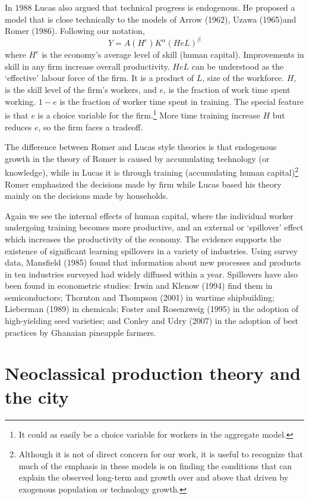 In 1988 Lucas also argued that technical progress is endogenous. He proposed a model that is  close technically to the models of Arrow (1962), Uzawa (1965)and Romer (1986). Following our notation, 
\[ Y = A(H^e) K^\alpha (HeL)^\beta \] 
where $H^e$ is the economy's average level of skill (human capital).  Improvements in skill in any firm  increase overall productivity.  $HeL$  can be understood as the `effective' labour force of the firm. It is a product of $L$, size of the workforce. $H$, is the skill level of the firm's workers, and $e$, is the fraction of work time spent working. $1-e$ is the fraction of worker time  spent in training. The  special feature is that $e$ is a choice variable for the firm.\footnote{It could as easily be a choice variable for workers in the aggregate model.} More time training increase $H$ but reduces $e$, so the firm faces a tradeoff.

The difference between Romer and Lucas style theories is that endogenous growth in the theory of Romer is caused by accumulating technology (or knowledge), while in Lucas it is through training (accumulating human capital)\footnote{Although it is not of direct concern for our work, it is useful to recognize that much of the emphasis in these models is on finding the conditions that can explain the observed long-term  and growth over and above that driven by exogenous population or technology growth. } Romer  emphasized the decisions made by firm while Lucas  based his theory mainly on the decisions made by households. 


Again we see the  internal effects of human capital, where the individual worker undergoing training becomes more productive, and an external or `spillover' effect which increases the productivity of the economy. 
The evidence supports the existence of significant learning spillovers in a variety of industries. Using survey data, Mansfield (1985) found that information about new processes and products in ten industries surveyed had widely diffused within a year. Spillovers have also been found in econometric studies: Irwin and Klenow (1994) find them in semiconductors; Thornton and Thompson (2001) in wartime shipbuilding; Lieberman (1989) in chemicals; Foster and Rosenzweig (1995) in the adoption of high-yielding seed varieties; and Conley and Udry (2007) in the adoption of best practices by Ghanaian pineapple farmers. 

\section{Neoclassical production theory and the city}

